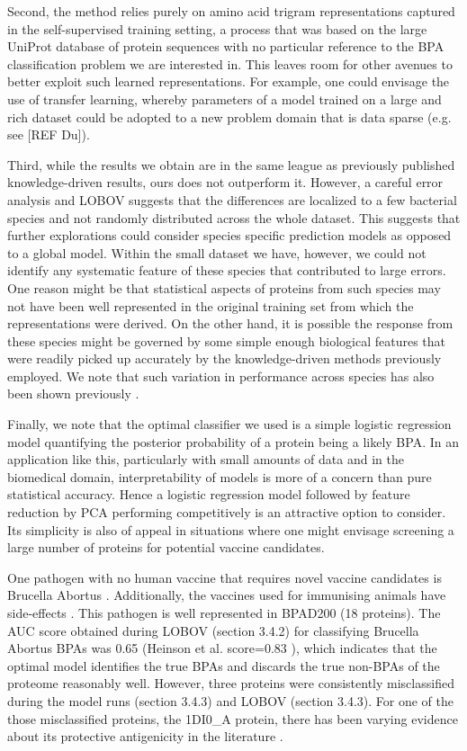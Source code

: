 \documentclass[10pt,journal,compsoc,twoside]{IEEEtran}
\begin{document}
Second, the method relies purely on amino acid trigram representations captured in the self-supervised training setting, a process that was based on the large UniProt database of protein sequences \cite{uniprot_2018} with no particular reference to the BPA classification problem we are interested in. This leaves room for other avenues to better exploit such learned representations. For example, one could envisage the use of transfer learning, whereby parameters of a model trained on a large and rich dataset could be adopted to a new problem domain that is data sparse (e.g. see [REF Du]). 

Third, while the results we obtain are in the same league as previously published knowledge-driven results, ours does not outperform it. However, a careful error analysis and LOBOV suggests that the differences are localized to a few bacterial species and not randomly distributed across the whole dataset. This suggests that further explorations could consider species specific prediction models as opposed to a global model. Within the small dataset we have, however, we could not identify any systematic feature of these species that contributed to large errors. One reason might be that statistical aspects of proteins from such species may not have been well represented in the original training set from which the representations were derived. On the other hand, it is possible the response from these species might be governed by some simple enough biological features that were readily picked up accurately by the knowledge-driven methods previously employed. We note that such variation in performance across species has also been shown previously \cite{heinson_2019}.

Finally, we note that the optimal classifier we used is a simple logistic regression model quantifying the posterior probability of a protein being a likely BPA. In an application like this, particularly with small amounts of data and in the biomedical domain, interpretability of models is more of a concern than pure statistical accuracy. Hence a logistic regression model followed by feature reduction by PCA performing competitively is an attractive option to consider. Its simplicity is also of appeal in situations where one might envisage screening a large number of proteins for potential vaccine candidates.    

One pathogen with no human vaccine that requires novel vaccine candidates is Brucella Abortus \cite{new-gen-brucella-vaccines}. Additionally, the vaccines used for immunising animals have side-effects \cite{dorneles_2015}. This pathogen is well represented in BPAD200 (18 proteins). The AUC score obtained during LOBOV (section 3.4.2) for classifying Brucella Abortus BPAs was 0.65 (Heinson et al. score=0.83 \cite{heinson_2019}), which indicates that the optimal model identifies the true BPAs and discards the true non-BPAs of the proteome reasonably well. However, three proteins were consistently misclassified during the model runs (section 3.4.3) and LOBOV (section 3.4.3). For one of the those misclassified proteins, the 1DI0\_A protein, there has been varying evidence about its protective antigenicity in the literature \cite{velikovsky_goldbaum_bowden_2002} \cite{velikovsky_goldbaum_bowden_2003} \cite{laplagne_2004}.   
	
\end{document}
